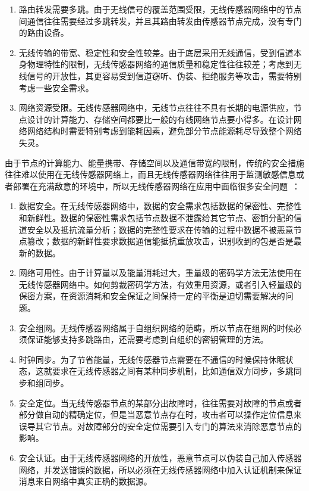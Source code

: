 \documentclass[a4paper,10pt]{article}
\begin{document}
\begin{enumerate}

\item 路由转发需要多跳。由于无线信号的覆盖范围受限，无线传感器网络中的节点间通信往往需要经过多跳转发，并且其路由转发由传感器节点完成，没有专门的路由设备。

\item 无线传输的带宽、稳定性和安全性较差。由于底层采用无线通信，受到信道本身物理特性的限制，无线传感器网络的通信质量和稳定性往往较差；考虑到无线信号的开放性，其更容易受到信道窃听、伪装、拒绝服务等攻击，需要特别考虑一些安全需求。

\item 网络资源受限。无线传感器网络中，无线节点往往不具有长期的电源供应，节点设计的计算能力、存储空间都要比一般的有线网络节点要小得多。在设计网络网络结构时需要特别考虑到能耗因素，避免部分节点能源耗尽导致整个网络失灵。

\end{enumerate}

由于节点的计算能力、能量携带、存储空间以及通信带宽的限制，传统的安全措施往往难以使用在无线传感器网络上，而且无线传感器网络往往用于监测敏感信息或者部署在充满敌意的环境中，所以无线传感器网络在应用中面临很多安全问题~\cite{Xiao2006}：

\begin{enumerate}

\item 数据安全。在无线传感器网络中，数据的安全需求包括数据的保密性、完整性和新鲜性。数据的保密性需求包括节点数据不泄露给其它节点、密钥分配的信道安全以及抵抗流量分析；数据的完整性要求在传输的过程中数据不被恶意节点篡改；数据的新鲜性要求数据通信能抵抗重放攻击，识别收到的包是否是最新的数据。

\item 网络可用性。由于计算量以及能量消耗过大，重量级的密码学方法无法使用在无线传感器网络中。如何剪裁密码学方法，有效重用资源，或者引入轻量级的保密方案，在资源消耗和安全保证之间保持一定的平衡是迫切需要解决的问题。

\item 安全组网。无线传感器网络属于自组织网络的范畴，所以节点在组网的时候必须保证能够支持多跳路由，还需要考虑到自组织的密钥管理的方法。

\item 时钟同步。为了节省能量，无线传感器节点需要在不通信的时候保持休眠状态，这就要求在无线传感器之间有某种同步机制，比如通信双方同步，多跳同步和组同步。

\item 安全定位。当无线传感器节点的某部分出故障时，往往需要对故障的节点或者部分做自动的精确定位，但是当恶意节点存在时，攻击者可以操作定位信息来误导其它节点。对故障部分的安全定位需要引入专门的算法来消除恶意节点的影响。

\item 安全认证。由于无线传感器网络的开放性，恶意节点可以伪装自己加入传感器网络，并发送错误的数据，所以必须在无线传感器网络中加入认证机制来保证消息来自网络中真实正确的数据源。

\end{enumerate}
\end{document}
